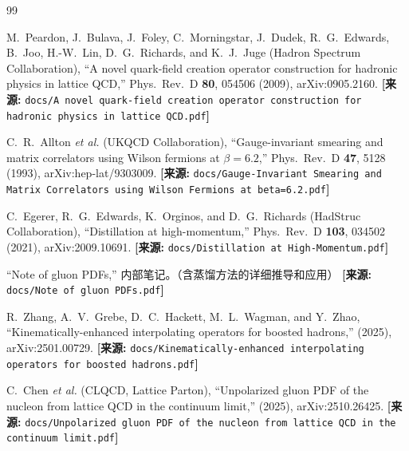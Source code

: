 \documentclass[12pt,a4paper]{ctexart}
\theoremstyle{definition}
\begin{document}
\begin{thebibliography}{99}


M.~Peardon, J.~Bulava, J.~Foley, C.~Morningstar, J.~Dudek, R.~G.~Edwards, B.~Joo, H.-W.~Lin, D.~G.~Richards, and K.~J.~Juge (Hadron Spectrum Collaboration),
``A novel quark-field creation operator construction for hadronic physics in lattice QCD,''
Phys.\ Rev.\ D \textbf{80}, 054506 (2009), arXiv:0905.2160.
\quad\textbf{[来源:} \texttt{docs/A novel quark-field creation operator construction for hadronic physics in lattice QCD.pdf}\textbf{]}


C.~R.~Allton \textit{et al.} (UKQCD Collaboration),
``Gauge-invariant smearing and matrix correlators using Wilson fermions at $\beta=6.2$,''
Phys.\ Rev.\ D \textbf{47}, 5128 (1993), arXiv:hep-lat/9303009.
\quad\textbf{[来源:} \texttt{docs/Gauge-Invariant Smearing and Matrix Correlators using Wilson Fermions at beta=6.2.pdf}\textbf{]}


C.~Egerer, R.~G.~Edwards, K.~Orginos, and D.~G.~Richards (HadStruc Collaboration),
``Distillation at high-momentum,''
Phys.\ Rev.\ D \textbf{103}, 034502 (2021), arXiv:2009.10691.
\quad\textbf{[来源:} \texttt{docs/Distillation at High-Momentum.pdf}\textbf{]}


``Note of gluon PDFs,''
内部笔记。（含蒸馏方法的详细推导和应用）
\quad\textbf{[来源:} \texttt{docs/Note of gluon PDFs.pdf}\textbf{]}


R.~Zhang, A.~V.~Grebe, D.~C.~Hackett, M.~L.~Wagman, and Y.~Zhao,
``Kinematically-enhanced interpolating operators for boosted hadrons,''
(2025), arXiv:2501.00729.
\quad\textbf{[来源:} \texttt{docs/Kinematically-enhanced interpolating operators for boosted hadrons.pdf}\textbf{]}


C.~Chen \textit{et al.} (CLQCD, Lattice Parton),
``Unpolarized gluon PDF of the nucleon from lattice QCD in the continuum limit,''
(2025), arXiv:2510.26425.
\quad\textbf{[来源:} \texttt{docs/Unpolarized gluon PDF of the nucleon from lattice QCD in the continuum limit.pdf}\textbf{]}


\end{thebibliography}
\end{document}
